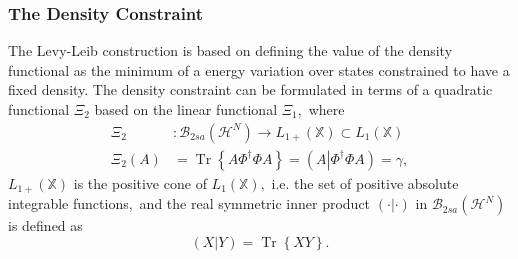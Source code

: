 \documentclass[aps,preprint]{revtex4}%
\begin{document}
\subsubsection{The Density Constraint}

The Levy-Leib construction is based on defining the value of the density
functional as the minimum of a energy variation over states constrained to
have a fixed density. The density constraint can be formulated in terms of a
quadratic functional $\Xi_{2}$ based on the linear functional $\Xi_{1},$
where
\begin{align}
\Xi_{2}  &  :\mathcal{B}_{2sa}\left(  \mathcal{H}^{N}\right)  \rightarrow
L_{1+}\left(  \mathbb{X}\right)  \subset L_{1}\left(  \mathbb{X}\right)
\nonumber\\
\Xi_{2}\left(  A\right)   &  =\operatorname{Tr}\left\{  A\Phi^{\dagger}\Phi
A\right\}  =\left(  A\left\vert \Phi^{\dagger}\Phi A\right.  \right)  =\gamma,
\label{QuadCon}%
\end{align}
$L_{1+}\left(  \mathbb{X}\right)  $ is the positive cone of $L_{1}\left(
\mathbb{X}\right)  ,$ i.e. the set of positive absolute integrable
functions$,$ and the real symmetric inner product $\left(  \cdot\left\vert
\cdot\right.  \right)  $ in $\mathcal{B}_{2sa}\left(  \mathcal{H}^{N}\right)
$ is defined as
\begin{equation}
\left(  X\left\vert Y\right.  \right)  =\operatorname{Tr}\left\{  XY\right\}
. \label{Opinner}%
\end{equation}
\end{document}
